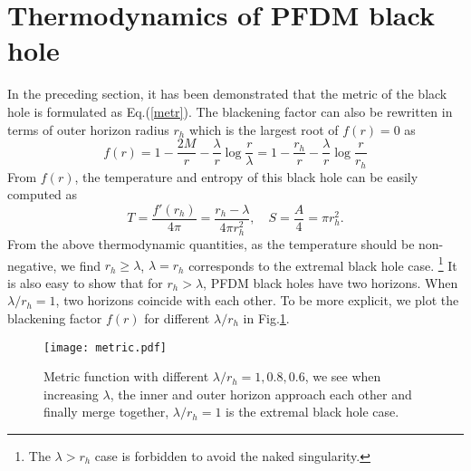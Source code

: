 \documentclass[a4paper,11pt]{article}
\begin{document}
\section{Thermodynamics of PFDM black hole } \label{thermo}
In the preceding section, it has been demonstrated that the metric of the black hole is formulated as Eq.(\ref{metr}).
The blackening factor can also be rewritten in terms of outer horizon radius $r_{h}$ which is the largest root of $f(r)=0$ as 
\begin{equation}
    f(r)=1-\frac{2M}{r}-\frac{\lambda}{r} \log \frac{r}{\lambda}=1-\frac{r_{h}}{r}-\frac{\lambda}{r} \log \frac{r}{r_{h}}
\end{equation}
From $f(r)$, the temperature and entropy of this black hole can be easily computed as 
\begin{equation}
    T=\frac{f'(r_{h})}{4\pi}=\frac{r_{h}-\lambda}{4\pi r_{h}^{2}}, \quad S=\frac{A}{4}=\pi r_{h}^{2}.
\end{equation}
From the above thermodynamic quantities, as the temperature should be non-negative, we find $r_{h}\geqslant \lambda$, $\lambda=r_h$ corresponds to the extremal black hole case. \footnote{The $\lambda>r_{h}$ case is forbidden to avoid the naked singularity.}  
It is also easy to show that for $r_{h}>\lambda$, PFDM black holes have two horizons. When  $\lambda/r_h=1$, two horizons coincide with each other. To be more explicit, we plot the blackening factor $f(r)$ for different $\lambda/r_{h}$ in Fig.\ref{3}.
\begin{figure}[!ht]
	\centering
	\texttt{[image: metric.pdf]}
 \caption{Metric function with different $\lambda/r_{h}=1,0.8,0.6$, we see when increasing $\lambda$, the inner and outer horizon approach each other and finally merge together,  $\lambda/r_{h}=1$ is the extremal black hole case.} \label{3}
\end{figure}
\end{document}
